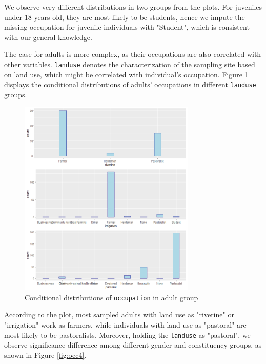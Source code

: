 \documentclass[11pt,twoside]{article}
\numberwithin{Theorem}{section}
\numberwithin{Definition}{section}
\numberwithin{Lemma}{section}
\numberwithin{Algorithm}{section}
\numberwithin{equation}{section}
\begin{document}
We observe very different distributions in two groups from the plots. For juveniles under 18 years old, they are most likely to be students, hence we impute the missing occupation for juvenile individuals with "Student", which is consistent with our general knowledge.  

The case for adults is more complex, as their occupations are also correlated with other variables. \texttt{landuse} denotes the characterization of the sampling site based on land use, which might be correlated with individual's occupation. Figure \ref{fig:occ3} displays the conditional distributions of adults' occupations in different \texttt{landuse} groups.

\begin{figure}[!h]
	\centering
	\includegraphics[width = 0.75\textwidth]{Images/occupation_landuse.png}
	\caption{Conditional distributions of \texttt{occupation} in adult group}
	\label{fig:occ3}		
\end{figure} 

According to the plot, most sampled adults with land use as "riverine" or "irrigation" work as farmers, while individuals with land use as "pastoral" are most likely to be pastoralists. Moreover, holding the \texttt{landuse} as "pastoral", we observe significance difference among different gender and constituency groups, as shown in Figure \ref{fig:occ4}.
\end{document}
